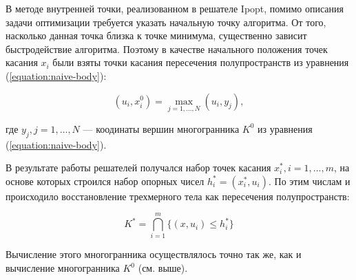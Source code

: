 \documentclass[a4paper, 10pt]{article}
\theoremstyle{definition}
\theoremstyle{plain}
\theoremstyle{plain}
\begin{document}
В методе внутренней точки, реализованном в решателе Ipopt, помимо описания
задачи оптимизации требуется указать начальную точку алгоритма. От того,
насколько данная точка близка к точке минимума, существенно зависит
быстродействие алгоритма. Поэтому в качестве начального положения точек касания
$x_{i}$ были взяты точки касания пересечения полупространств из уравнения
(\ref{equation:naive-body}):

\begin{equation}
 (u_{i}, x^{0}_{i}) = \max \limits_{j = 1, \ldots, N} (u_{i}, y_{j}),
\end{equation}

где $y_{j}, j = 1, \ldots, N$ --- коодинаты вершин многогранника $K^{0}$ из
уравнения (\ref{equation:naive-body}).

В результате работы решателей получался набор точек касания
$x^{*}_{i}, i = 1, \ldots, m$, на основе которых строился набор опорных чисел
$h^{*}_{i} = (x^{*}_{i}, u_{i})$. По этим числам и происходило восстановление
трехмерного тела как пересечения полупространств:

\begin{equation}
 K^{*} = \bigcap \limits_{i = 1}^{m} \{(x, u_{i}) \leq h^{*}_{i}\}
\end{equation}

Вычисление этого многогранника осуществлялось точно так же, как и вычисление
многогранника $K^{0}$ (см. выше).



\end{document}
